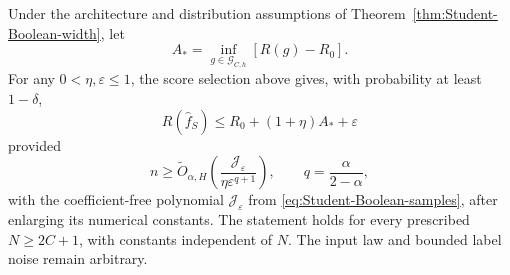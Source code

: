 \begin{theorem}
\label{thm:Student-Boolean-excess}
Under the architecture and distribution assumptions of Theorem~\ref{thm:Student-Boolean-width}, let
\[
 A_* =\inf_{g\in\mathcal G_{C,h}}[R(g)-R_0].
\]
For any $0<\eta,\varepsilon\le1$, the score selection above gives, with probability at least $1-\delta$,
\begin{equation}
 R(\widehat f_S)\le R_0+(1+\eta)A_*+\varepsilon
 \label{eq:Student-Boolean-excess-conclusion}
\end{equation}
provided
\begin{equation}
 n\ge\widetilde O_{\alpha,H}\left(
       \frac{\mathcal J_\varepsilon}{\eta\varepsilon^{q+1}}\right),
 \qquad q=\frac\alpha{2-\alpha},
 \label{eq:Student-Boolean-excess-samples}
\end{equation}
with the coefficient-free polynomial $\mathcal J_\varepsilon$ from \eqref{eq:Student-Boolean-samples}, after enlarging its numerical constants. The statement holds for every prescribed $N\ge2C+1$, with constants independent of $N$. The input law and bounded label noise remain arbitrary.
\end{theorem}
